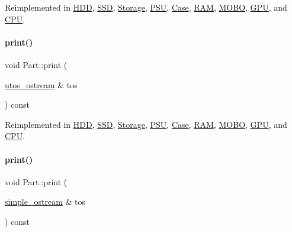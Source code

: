 Reimplemented in \mbox{\hyperlink{class_h_d_d_a07c34356018542934a4dd91ce38b0821}{H\+DD}}, \mbox{\hyperlink{class_s_s_d_a3c07aa0fd7bb547cfb4a775513e427a9}{S\+SD}}, \mbox{\hyperlink{class_storage_aa9f6ffb0fd45839b54bd4e254270445d}{Storage}}, \mbox{\hyperlink{class_p_s_u_ad8f95676e09f5ba805dbba50759f44ba}{P\+SU}}, \mbox{\hyperlink{class_case_a9e54f42dcb7b62f1792a6475ce60aa79}{Case}}, \mbox{\hyperlink{class_r_a_m_a2f226659cbc23f841d73525572ba9574}{R\+AM}}, \mbox{\hyperlink{class_m_o_b_o_a3241f425030e01d5b7a192c23af2dbda}{M\+O\+BO}}, \mbox{\hyperlink{class_g_p_u_abfa2a8fa30047e9759080d724e4b3820}{G\+PU}}, and \mbox{\hyperlink{class_c_p_u_ad4d3ebb288deeaad640e034bdb71a40a}{C\+PU}}.

\mbox{\label{class_part_a9ecabe44ba3415badf82c6a23617a41e}} 
\paragraph{\texorpdfstring{print()}{print()}\hspace{0.1cm}{\footnotesize\ttfamily [2/4]}}
{\footnotesize\ttfamily void Part\+::print (\begin{DoxyParamCaption}\item[{\mbox{\hyperlink{structutos__ostream}{utos\+\_\+ostream}} \&}]{tos }\end{DoxyParamCaption}) const\hspace{0.3cm}{\ttfamily [virtual]}}



Reimplemented in \mbox{\hyperlink{class_h_d_d_aca2c2583fa3304917905cd9185b64539}{H\+DD}}, \mbox{\hyperlink{class_s_s_d_ab07086e302f8be99cfa757583d2017a0}{S\+SD}}, \mbox{\hyperlink{class_storage_ab7ecf9e0777891b4e1a84bbf391a1cd4}{Storage}}, \mbox{\hyperlink{class_p_s_u_a81c74aa3a327003c58b89ca2b8602c1d}{P\+SU}}, \mbox{\hyperlink{class_case_ae179519844b825815f4accddafae13b6}{Case}}, \mbox{\hyperlink{class_r_a_m_a11a874dd6cf99454efd6b7a1d20a3737}{R\+AM}}, \mbox{\hyperlink{class_m_o_b_o_a4c78cec3a2a3e4d4480855622f50bd06}{M\+O\+BO}}, \mbox{\hyperlink{class_g_p_u_acfa9ab35cdf1c25c324fc39c6ffc2412}{G\+PU}}, and \mbox{\hyperlink{class_c_p_u_a0aea700bac0896b9e4434770737078d0}{C\+PU}}.

\mbox{\label{class_part_aa602d876151b63db72cf8f666847a8cd}} 
\paragraph{\texorpdfstring{print()}{print()}\hspace{0.1cm}{\footnotesize\ttfamily [3/4]}}
{\footnotesize\ttfamily void Part\+::print (\begin{DoxyParamCaption}\item[{\mbox{\hyperlink{structsimple__ostream}{simple\+\_\+ostream}} \&}]{tos }\end{DoxyParamCaption}) const\hspace{0.3cm}{\ttfamily [virtual]}}



